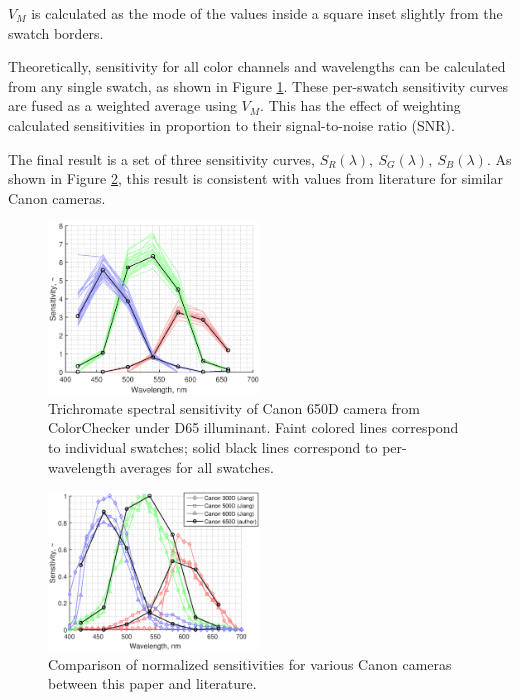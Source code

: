 \documentclass[twocolumn,10pt]{asme2ej}
\newcommand{\id}{\hspace{6 mm}}
\begin{document}
$V_M$ is calculated as the mode of the values inside a square inset slightly from the swatch borders.

\id Theoretically, sensitivity for all color channels and wavelengths can be calculated from any single swatch, as shown in Figure \ref{canon_650d_sensitivity}. These per-swatch sensitivity curves are fused as a weighted average using $V_M$. This has the effect of weighting calculated sensitivities in proportion to their signal-to-noise ratio (SNR).

\id The final result is a set of three sensitivity curves, $S_R(\lambda), \ S_G(\lambda), \ S_B(\lambda)$. As shown in Figure \ref{camera_spectral_sensitivities}, this result is consistent with values from literature for similar Canon cameras. \cite{Jiang}

\begin{figure}
\centering
\includegraphics[width=0.5\textwidth]{canon_650d_sensitivity.eps}
\caption{Trichromate spectral sensitivity of Canon 650D camera from ColorChecker under D65 illuminant. Faint colored lines correspond to individual swatches; solid black lines correspond to per-wavelength averages for all swatches.}
\label{canon_650d_sensitivity}
\end{figure}

\begin{figure}
\centering
\includegraphics[width=0.5\textwidth]{camera_spectral_sensitivities.eps}
\caption{Comparison of normalized sensitivities for various Canon cameras between this paper and literature. \cite{Jiang}}
\label{camera_spectral_sensitivities}
\end{figure}
\end{document}
